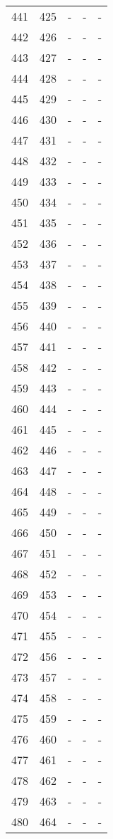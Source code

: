 \documentclass[10pt]{article}
\begin{document}
\begin {longtable}{l r r r r}
441 & 425 & - & - & - \\
442 & 426 & - & - & - \\
443 & 427 & - & - & - \\
444 & 428 & - & - & - \\
445 & 429 & - & - & - \\
446 & 430 & - & - & - \\
447 & 431 & - & - & - \\
448 & 432 & - & - & - \\
449 & 433 & - & - & - \\
450 & 434 & - & - & - \\
451 & 435 & - & - & - \\
452 & 436 & - & - & - \\
453 & 437 & - & - & - \\
454 & 438 & - & - & - \\
455 & 439 & - & - & - \\
456 & 440 & - & - & - \\
457 & 441 & - & - & - \\
458 & 442 & - & - & - \\
459 & 443 & - & - & - \\
460 & 444 & - & - & - \\
461 & 445 & - & - & - \\
462 & 446 & - & - & - \\
463 & 447 & - & - & - \\
464 & 448 & - & - & - \\
465 & 449 & - & - & - \\
466 & 450 & - & - & - \\
467 & 451 & - & - & - \\
468 & 452 & - & - & - \\
469 & 453 & - & - & - \\
470 & 454 & - & - & - \\
471 & 455 & - & - & - \\
472 & 456 & - & - & - \\
473 & 457 & - & - & - \\
474 & 458 & - & - & - \\
475 & 459 & - & - & - \\
476 & 460 & - & - & - \\
477 & 461 & - & - & - \\
478 & 462 & - & - & - \\
479 & 463 & - & - & - \\
480 & 464 & - & - & - \\

\end{longtable}
\end{document}
